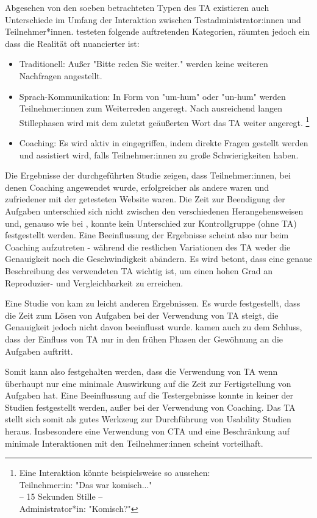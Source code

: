 Abgesehen von den soeben betrachteten Typen des \acl{TA} existieren auch Unterschiede im Umfang der Interaktion zwischen Testadministrator:innen und Teilnehmer*innen. \textcite{olmsted-hawalaThinkaloudProtocols2010} testeten folgende auftretenden Kategorien, räumten jedoch ein dass die Realität oft nuancierter ist:
\begin{itemize}
  \item Traditionell: Außer "Bitte reden Sie weiter." werden keine weiteren Nachfragen angestellt.
  \item Sprach-Kommunikation: In Form von "um-hum" oder "un-hum" werden Teilnehmer:innen zum Weiterreden angeregt. Nach ausreichend langen Stillephasen wird mit dem zuletzt geäußerten Wort das \acl{TA} weiter angeregt. \footnote{Eine Interaktion könnte beispielsweise so aussehen:\\ Teilnehmer:in: "Das war komisch..." \\ -- 15 Sekunden Stille -- \\ Administrator*in: "Komisch?"} 
  \item Coaching: Es wird aktiv in eingegriffen, indem direkte Fragen gestellt werden und assistiert wird, falls Teilnehmer:innen zu große Schwierigkeiten haben.
\end{itemize}
Die Ergebnisse der \citeyear{olmsted-hawalaThinkaloudProtocols2010} durchgeführten Studie zeigen, dass Teilnehmer:innen, bei denen Coaching angewendet wurde, erfolgreicher als andere waren und zufriedener mit der getesteten Website waren. Die Zeit zur Beendigung der Aufgaben unterschied sich nicht zwischen den verschiedenen Herangehensweisen und, genauso wie bei \citeauthor{alhadretiRethinkingThinking2018}, konnte kein Unterschied zur Kontrollgruppe (ohne \ac{TA}) festgestellt werden. Eine Beeinflussung der Ergebnisse scheint also nur beim Coaching aufzutreten - während die restlichen Variationen des \ac{TA} weder die Genauigkeit noch die Geschwindigkeit abändern. Es wird betont, dass eine genaue Beschreibung des verwendeten \acl{TA} wichtig ist, um einen hohen Grad an Reproduzier- und Vergleichbarkeit zu erreichen.

Eine Studie von \textcite{rheniusEvaluationConcurrent1990} kam zu leicht anderen Ergebnissen. Es wurde festgestellt, dass die Zeit zum Lösen von Aufgaben bei der Verwendung von \ac{TA} steigt, die Genauigkeit jedoch nicht davon beeinflusst wurde. \citeauthor{rheniusEvaluationConcurrent1990} kamen auch zu dem Schluss, dass der Einfluss von \ac{TA} nur in den frühen Phasen der Gewöhnung an die Aufgaben auftritt.
\parencite{rheniusEvaluationConcurrent1990}

Somit kann also festgehalten werden, dass die Verwendung von \ac{TA} wenn überhaupt nur eine minimale Auswirkung auf die Zeit zur Fertigstellung von Aufgaben hat. Eine Beeinflussung auf die Testergebnisse konnte in keiner der Studien festgestellt werden, außer bei der Verwendung von Coaching. Das \acl{TA} stellt sich somit als gutes Werkzeug zur Durchführung von Usability Studien heraus. Insbesondere eine Verwendung von \acl{CTA} und eine Beschränkung auf minimale Interaktionen mit den Teilnehmer:innen scheint vorteilhaft.
